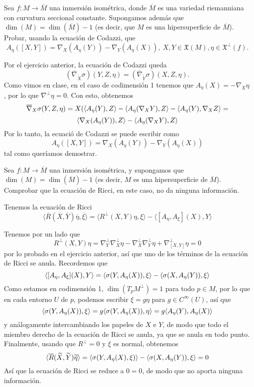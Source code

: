 \documentclass[twoside]{article}
\begin{document}
\newpage
\begin{ejercicio}{2}
Sea $f : M → \overline{M}$ una inmersión isométrica, donde $\overline{M}$ es una variedad riemanniana
con curvatura seccional constante. Supongamos además que $\dim(M) = \dim(\overline{M}) − 1$
(es decir, que $M$ es una hipersuperficie de $\overline{M}$).
Probar, usando la ecuación de Codazzi, que
\[
A_η([X, Y ]) = ∇_X(A_η(Y)) − ∇_Y (A_η(X)),\ X, Y ∈ \mathfrak{X}(M), η ∈ \mathfrak{X}^⊥(f).
\]
\end{ejercicio}
\begin{solucion}
Por el ejercicio anterior, la ecuación de Codazzi queda 
\[
(\overline{∇}_{\widetilde{X}} σ)(Y, Z, η) = (\overline{∇}_{\widetilde{Y}} σ)(X, Z, η).
\]
Como vimos en clase, en el caso de codimensión 1 tenemos que $A_\eta(X)=-\nabla_X \eta$, por lo que $\nabla^\perp\eta=0$. Con esto, obtenemos
\[
\overline{\nabla}_X\sigma(Y,Z,\eta)=X(\langle{A_\eta(Y),Z}\rangle-\langle{A_\eta(\nabla_XY),Z}\rangle-\langle{A_\eta(Y),\nabla_XZ}\rangle=
\]
\[
\langle{\nabla_X(A_\eta(Y)),Z}\rangle-\langle{A_\eta(\nabla_XY),Z}\rangle
\]
Por lo tanto, la ecuació de Codazzi se puede escribir como 
\[
A_η([X, Y ]) = ∇_X(A_η(Y)) − ∇_Y (A_η(X))
\]
tal como queríamos demostrar. 
\end{solucion}
\newpage

\begin{ejercicio}{3}
Sea $f : M → \overline{M}$ una inmersión isométrica, y supongamos que $\dim(M) = \dim(\overline{M})−1$
(es decir, $M$ es una hipersuperficie de $\overline{M}$).
Comprobar que la ecuación de Ricci, en este caso, no da ninguna información.

\end{ejercicio}
\begin{solucion}
Tenemos la ecuación de Ricci 
\[
\langle \overline{R}(\overline{X},\overline{Y})\overline{\eta},\overline{\xi}\rangle=\langle R^\perp (X,Y)\eta,\xi\rangle -\langle [A_\eta,A_\xi](X),Y\rangle
\]

Tenemos por un lado que 
\[
R^\perp (X,Y)\eta=\nabla_Y^\perp \nabla_X^\perp\eta-\nabla_X^\perp \nabla_Y^\perp\eta+\nabla_{[X,Y]}^\perp\eta=0
\]
por lo probado en el ejercicio anterior, así que uno de los términos de la ecuación de Ricci se anula. Recordemos que
\[
\langle [A_\eta,A_\xi](X),Y\rangle=\langle{\sigma(Y,A_\eta(X)),\xi}\rangle-\langle{\sigma(X,A_\eta(Y)),\xi}\rangle
\]
Como estamos en codimensión 1, $\dim(T_pM^\perp)=1$ para todo $p\in M$, por lo que en cada entorno $U$ de $p$, podemos escribir $\xi=g\eta$ para $g\in C^{\infty}(U)$, así que
\[
\langle{\sigma(Y,A_\eta(X)),\xi}\rangle=g\langle{\sigma(Y,A_\eta(X)),\eta}\rangle=g\langle{A_\eta(Y),A_\eta(X)}\rangle
\]
y análogamente intercambiando los papeles de $X$ e $Y$, de modo que todo el miembro derecho de la ecuación de Ricci se anula, ya que se anula en todo punto. Finalmente, usando que $R^\perp=0$ y $\xi$ es normal, obtenemos
\[
\langle{\overline{R}(\widetilde{X},\widetilde{Y})\widetilde{\eta}}\rangle=\langle{\sigma(Y,A_\eta(X),\xi)}\rangle-\langle{\sigma(X,A_\eta(Y)),\xi}\rangle=0
\]
Así que la ecuación de Ricci se reduce a $0=0$, de modo que no aporta ninguna información. 
\end{solucion}
\newpage
\end{document}
